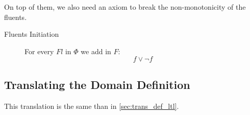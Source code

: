 On top of them, we also need an axiom to break the non-monotonicity of the fluents.

\begin{description}
  \item[Fluents Initiation]
  For every $Fl$ in $\Phi$ we add in $F$:
  \begin{equation}\tag{$A.3$}
    f \lor \neg f
  \end{equation}
\end{description}

\subsection{Translating the Domain Definition}

This translation is the same than in \ref{sec:trans_def_ltl}.

